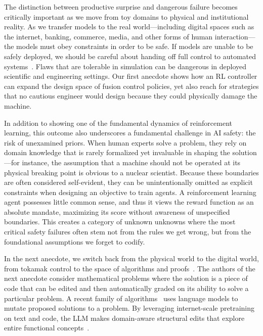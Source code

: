 \documentclass[10pt]{article}
\def\citep#1{}%
\begin{document}
The distinction between productive surprise and dangerous failure becomes critically important as we move from toy domains to physical and institutional reality.  
As we transfer models to the real world---including digital spaces such as the internet, banking, commerce, media, and other forms of human interaction---the models must obey constraints in order to be safe.
If models are unable to be safely deployed, we should be careful about handing off full control to automated systems~\citep{Bengio2024risk}. 
Flaws that are tolerable in simulation can be dangerous in deployed scientific and engineering settings. 
Our first anecdote shows how an RL controller can expand the design space of fusion control policies, yet also reach for strategies that no cautious engineer would design because they could physically damage the machine.



In addition to showing one of the fundamental dynamics of reinforcement learning, this outcome also underscores a fundamental challenge in AI safety: the risk of unexamined priors. 
When human experts solve a problem, they rely on domain knowledge that is rarely formalized yet invaluable in shaping the solution---for instance, the assumption that a machine should not be operated at its physical breaking point is obvious to a nuclear scientist.
Because these boundaries are often considered self-evident, they can be unintentionally omitted as explicit constraints when designing an objective to train agents.
A reinforcement learning agent possesses little common sense, and thus it views the reward function as an absolute mandate, maximizing its score without awareness of unspecified boundaries.
This creates a category of unknown unknowns where the most critical safety failures often stem not from the rules we get wrong, but from the foundational assumptions we forget to codify.

In the next anecdote, we switch back from the physical world to the digital world, from tokamak control to the space of algorithms and proofs~\citep{Wang2023ai4science, Hubert2025}.
The authors of the next anecdote consider mathematical problems where the solution is a piece of code that can be edited and then automatically graded on its ability to solve a particular problem.
A recent family of algorithms~\citep{lehman2022evolutionlargemodels} uses language models to mutate proposed solutions to a problem. 
By leveraging internet-scale pretraining on text and code, the LLM makes domain-aware structural edits that explore entire functional concepts~\citep{hemberg2024evolvingcodelargelanguage}.
\end{document}

